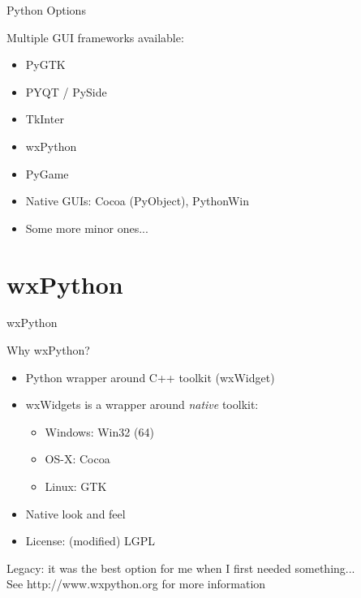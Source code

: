 \documentclass{beamer}
\begin{document}
\begin{frame}[fragile]{Python Options}



{\Large Multiple GUI frameworks available:}

\begin{itemize}
  \item PyGTK
  \item PYQT / PySide
  \item TkInter
  \item wxPython
  \item PyGame
  \item Native GUIs: Cocoa (PyObject), PythonWin
  \item Some more minor ones...
\end{itemize}

\end{frame}

\section{wxPython}

\begin{frame}[fragile]{wxPython}

{\Large Why wxPython?}

\begin{itemize}
  \item Python wrapper around C++ toolkit (wxWidget)
  \item wxWidgets is a wrapper around \emph{native} toolkit:
  \begin{itemize}
    \item Windows: Win32 (64)
    \item OS-X: Cocoa
    \item Linux: GTK
  \end{itemize}
  \item Native look and feel
  \item License: (modified) LGPL
\end{itemize}

\vfill
{\Large Legacy: it was the best option for me when I first needed something...}\\
See http://www.wxpython.org for more information

\end{frame}
\end{document}
